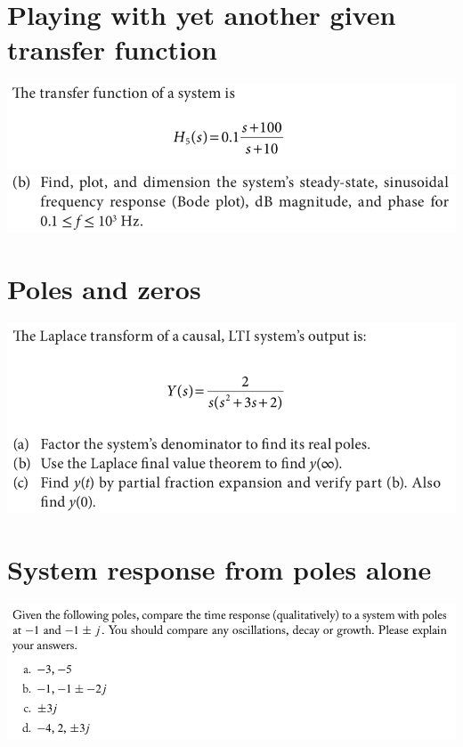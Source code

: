 \documentclass[11pt]{book}
\begin{document}
\newpage

\section{Playing with yet another given transfer function}
\begin{center}
	\includegraphics[width=\textwidth]{figures/q3.03.png} \\
	\includegraphics[width=\textwidth]{figures/q3.04.png}
\end{center}

\newpage

\section{Poles and zeros}
\begin{center}
	\includegraphics[width=\textwidth]{figures/q3.05.png}
\end{center}

\newpage

\section{System response from poles alone}
\begin{center}
	\includegraphics[width=\textwidth]{figures/q3.16.png}
\end{center}
\end{document}
